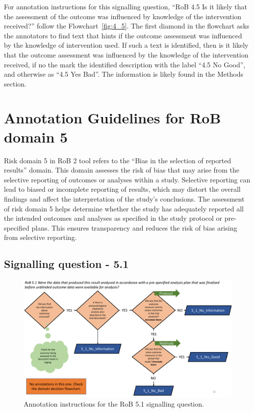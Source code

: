 \documentclass[sn-mathphys,Numbered]{sn-jnl}%
\begin{document}
For annotation instructions for this signalling question, ``RoB 4.5 Is it likely that the assessment of the outcome was influenced by knowledge of the intervention received?'' follow the Flowchart~\ref{fig:4_5}.
The first diamond in the flowchart asks the annotators to find text that hints if the outcome assessment was influenced by the knowledge of intervention used.
If such a text is identified, then is it likely that the outcome assessment was influenced by the knowledge of the intervention received, if no the mark the identified description with the label ``4.5 No Good'', and otherwise as ``4.5 Yes Bad''.
The information is likely found in the Methods section.

%
%
%
\section*{Annotation Guidelines for RoB domain 5}
\label{sec:dom5}
%
Risk domain 5 in RoB 2 tool refers to the ``Bias in the selection of reported results'' domain.
This domain assesses the risk of bias that may arise from the selective reporting of outcomes or analyses within a study.
Selective reporting can lead to biased or incomplete reporting of results, which may distort the overall findings and affect the interpretation of the study's conclusions.
The assessment of risk domain 5 helps determine whether the study has adequately reported all the intended outcomes and analyses as specified in the study protocol or pre-specified plans.
This ensures transparency and reduces the risk of bias arising from selective reporting.
%
%
%
\subsection*{Signalling question - 5.1 }
%
\begin{figure}[htbp]
    \centering
    \includegraphics[width=\textwidth]{figures/5_1.pdf}
    \caption{Annotation instructions for the RoB 5.1 signalling question.}
    \label{fig:5_1}
\end{figure}
%
%
%
\end{document}
